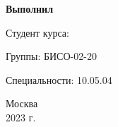     \vspace{16pt}

    \begin{flushright}
    \textbf{Выполнил\hspace{126pt}}
    
    Студент \coursenum \space курса: \hspace {0pt} \fio
    
    Группы: \hspace{63pt}БИСО-02-20
    
    Специальности: \hspace {38pt} 10.05.04
    \end{flushright}
    
    \vfill
    \begin{center}
    Москва\\
    
    2023 г.\\
    \end{center}
    
    \newpage
